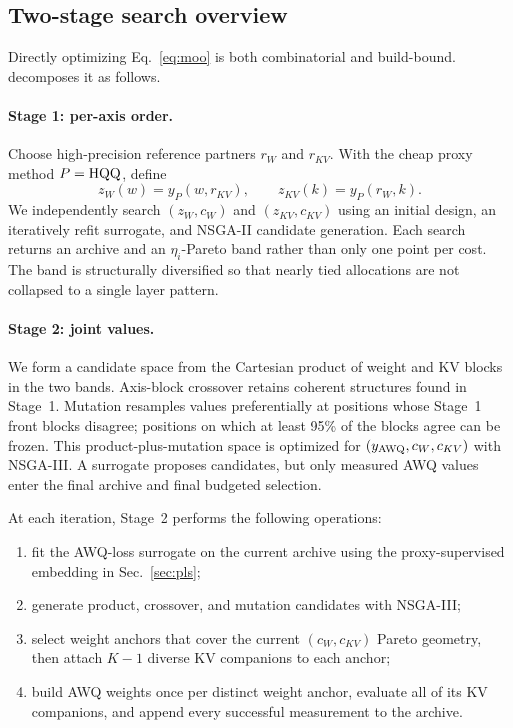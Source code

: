 \subsection{Two-stage search overview}
\label{sec:overview}

Directly optimizing Eq.~\eqref{eq:moo} is both combinatorial and build-bound.
\method{} decomposes it as follows.

\paragraph{Stage 1: per-axis order.}
Choose high-precision reference partners $r_W$ and $r_{KV}$.  With the cheap
proxy method $P=\mathrm{HQQ}$, define
\begin{equation}
  z_W(w)=y_P(w,r_{KV}),\qquad
  z_{KV}(k)=y_P(r_W,k).
  \label{eq:axis_scores}
\end{equation}
We independently search $(z_W,c_W)$ and $(z_{KV},c_{KV})$ using an initial
design, an iteratively refit surrogate, and NSGA-II candidate generation.  Each
search returns an archive and an $\eta_i$-Pareto band rather than only one point
per cost.  The band is structurally diversified so that nearly tied allocations
are not collapsed to a single layer pattern.

\paragraph{Stage 2: joint values.}
We form a candidate space from the Cartesian product of weight and KV blocks in
the two bands.  Axis-block crossover retains coherent structures found in
Stage~1.  Mutation resamples values preferentially at positions whose Stage~1
front blocks disagree; positions on which at least 95\% of the blocks agree can
be frozen.  This product-plus-mutation space is optimized for
$(y_{\mathrm{AWQ}},c_W,c_{KV})$ with NSGA-III.  A surrogate proposes candidates, but
only measured AWQ values enter the final archive and final budgeted selection.

At each iteration, Stage~2 performs the following operations:
\begin{enumerate}[leftmargin=*,itemsep=2pt]
    \item fit the AWQ-loss surrogate on the current archive using the
    proxy-supervised embedding in Sec.~\ref{sec:pls};
    \item generate product, crossover, and mutation candidates with NSGA-III;
    \item select weight anchors that cover the current
    $(c_W,c_{KV})$ Pareto geometry, then attach $K-1$ diverse KV companions to
    each anchor;
    \item build AWQ weights once per distinct weight anchor, evaluate all of its
    KV companions, and append every successful measurement to the archive.
\end{enumerate}

